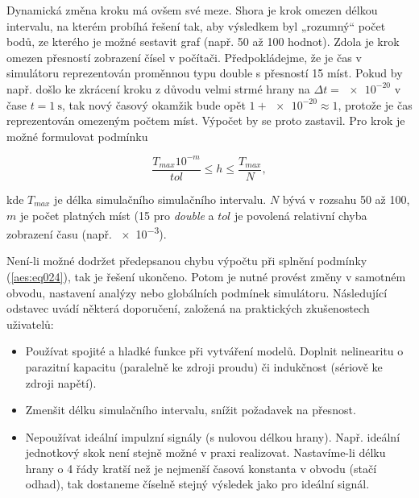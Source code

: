       

      Dynamická změna kroku má ovšem své meze. Shora je krok omezen délkou intervalu, na kterém
      probíhá řešení tak, aby výsledkem byl „rozumný“ počet bodů, ze kterého je možné sestavit graf
      (např. \num{50} až \num{100} hodnot). Zdola je krok omezen přesností zobrazení čísel v
      počítači. Předpokládejme, že je čas v simulátoru reprezentován proměnnou typu double s
      přesností \num{15} míst. Pokud by např. došlo ke zkrácení kroku z důvodu velmi strmé hrany na
      \(\Delta t = \num{e-20}\) v čase \(t = \qty{1}{\second}\), tak nový časový okamžik bude opět
      \(\num{1} + \num{e-20} \approx 1\), protože je čas reprezentován omezeným počtem míst. Výpočet
      by se proto zastavil. Pro krok je možné formulovat podmínku

      \begin{equation}\label{aes:eq024}
        \frac{T_{max}10^{-m}}{tol} \leq h \leq \frac{T_{max}}{N}, 
      \end{equation}

      kde \(T_{max}\) je délka simulačního simulačního intervalu. \(N\) bývá v rozsahu \num{50} až
      \num{100}, \(m\) je počet platných míst (\num{15} pro \emph{double} a \(tol\) je povolená
      relativní chyba zobrazení času (např. \num{e-3}).

      Není-li možné dodržet předepsanou chybu výpočtu při splnění podmínky (\ref{aes:eq024}), tak je
      řešení ukončeno. Potom je nutné provést změny v samotném obvodu, nastavení analýzy nebo
      globálních podmínek simulátoru. Následující odstavec uvádí některá doporučení, založená na
      praktických zkušenostech uživatelů:

      \begin{tcnote}
        \begin{itemize}[noitemsep]
          \item Používat spojité a hladké funkce při vytváření modelů. Doplnit nelinearitu o
                parazitní kapacitu (paralelně ke zdroji proudu) či indukčnost (sériově ke zdroji
                napětí).
          \item Zmenšit délku simulačního intervalu, snížit požadavek na přesnost. 
          \item Nepoužívat ideální impulzní signály (s nulovou délkou hrany). Např. ideální
                jednotkový skok není stejně možné v praxi realizovat. Nastavíme-li délku hrany o
                \num{4} řády kratší než je nejmenší časová konstanta v obvodu (stačí odhad), tak
                dostaneme číselně stejný výsledek jako pro ideální signál.
        \end{itemize}
      \end{tcnote}

